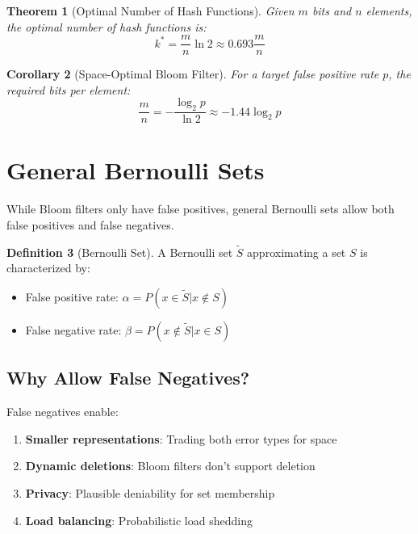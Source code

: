 \documentclass[11pt,twoside,openright]{book}
\theoremstyle{definition}
\newtheorem{definition}{Definition}[chapter]
\theoremstyle{plain}
\newtheorem{theorem}[definition]{Theorem}
\newtheorem{corollary}[definition]{Corollary}
\theoremstyle{remark}
\begin{document}
\begin{theorem}[Optimal Number of Hash Functions]
Given $m$ bits and $n$ elements, the optimal number of hash functions is:
\begin{equation}
k^* = \frac{m}{n} \ln 2 \approx 0.693 \frac{m}{n}
\end{equation}
\end{theorem}

\begin{corollary}[Space-Optimal Bloom Filter]
For a target false positive rate $p$, the required bits per element:
\begin{equation}
\frac{m}{n} = -\frac{\log_2 p}{\ln 2} \approx -1.44 \log_2 p
\end{equation}
\end{corollary}

\section{General Bernoulli Sets}

While Bloom filters only have false positives, general Bernoulli sets allow both false positives and false negatives.

\begin{definition}[Bernoulli Set]
A Bernoulli set $\tilde{S}$ approximating a set $S$ is characterized by:
\begin{itemize}
    \item False positive rate: $\alpha = P(x \in \tilde{S} | x \notin S)$
    \item False negative rate: $\beta = P(x \notin \tilde{S} | x \in S)$
\end{itemize}
\end{definition}

\subsection{Why Allow False Negatives?}

False negatives enable:
\begin{enumerate}
    \item \textbf{Smaller representations}: Trading both error types for space
    \item \textbf{Dynamic deletions}: Bloom filters don't support deletion
    \item \textbf{Privacy}: Plausible deniability for set membership
    \item \textbf{Load balancing}: Probabilistic load shedding
\end{enumerate}
\end{document}
